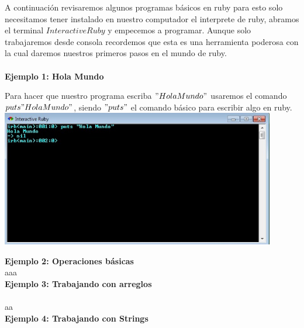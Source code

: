 \documentclass[11pt]{article} %
\begin{document}
A continuación revisaremos algunos programas básicos en ruby para esto solo necesitamos tener instalado en nuestro computador el interprete de ruby, abramos el terminal $ Interactive Ruby$  y empecemos a  programar. Aunque  solo trabajaremos desde consola  recordemos que esta es una herramienta poderosa con la cual daremos nuestros primeros pasos en el mundo de ruby.\\ \\


 {\fontsize{14}{0} \bf Ejemplo 1: Hola Mundo\\}

Para hacer que nuestro programa escriba $"Hola Mundo"$ usaremos el comando $puts  "Hola Mundo"$, siendo  $"puts"$ el comando básico para escribir algo en ruby. \\

 \includegraphics[width=12cm]{./imagenes/5.jpg}

 {\fontsize{14}{0} \bf Ejemplo 2: Operaciones básicas\\}
aaa\\

 {\fontsize{14}{0} \bf Ejemplo 3: Trabajando con arreglos\\ \\ }
aa\\

 {\fontsize{14}{0} \bf Ejemplo 4: Trabajando con Strings\\ }
\end{document}
